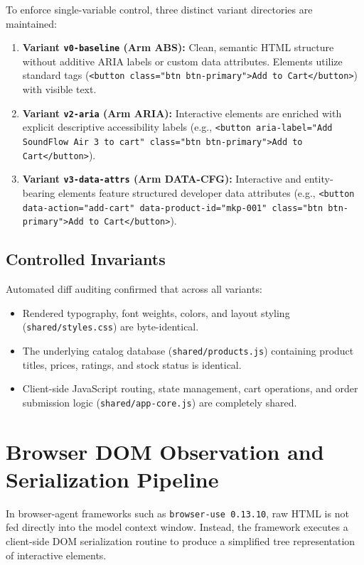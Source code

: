 \documentclass[11pt,a4paper]{article}
\begin{document}
To enforce single-variable control, three distinct variant directories are maintained:
\begin{enumerate}
    \item \textbf{Variant \texttt{v0-baseline} (Arm \textsc{ABS}):} Clean, semantic HTML structure without additive ARIA labels or custom data attributes. Elements utilize standard tags (\texttt{<button class="btn btn-primary">Add to Cart</button>}) with visible text.
    \item \textbf{Variant \texttt{v2-aria} (Arm \textsc{ARIA}):} Interactive elements are enriched with explicit descriptive accessibility labels (e.g., \texttt{<button aria-label="Add SoundFlow Air 3 to cart" class="btn btn-primary">Add to Cart</button>}).
    \item \textbf{Variant \texttt{v3-data-attrs} (Arm \textsc{DATA-CFG}):} Interactive and entity-bearing elements feature structured developer data attributes (e.g., \texttt{<button data-action="add-cart" data-product-id="mkp-001" class="btn btn-primary">Add to Cart</button>}).
\end{enumerate}

\subsection{Controlled Invariants}
Automated diff auditing confirmed that across all variants:
\begin{itemize}
    \item Rendered typography, font weights, colors, and layout styling (\texttt{shared/styles.css}) are byte-identical.
    \item The underlying catalog database (\texttt{shared/products.js}) containing product titles, prices, ratings, and stock status is identical.
    \item Client-side JavaScript routing, state management, cart operations, and order submission logic (\texttt{shared/app-core.js}) are completely shared.
\end{itemize}

\section{Browser DOM Observation and Serialization Pipeline}
\label{sec:pipeline}

In browser-agent frameworks such as \texttt{browser-use 0.13.10}, raw HTML is not fed directly into the model context window. Instead, the framework executes a client-side DOM serialization routine to produce a simplified tree representation of interactive elements.
\end{document}
